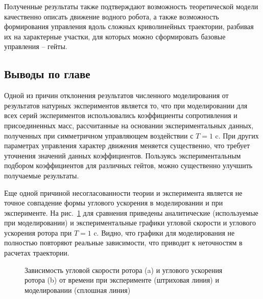 
Полученные результаты также подтверждают возможность теоретической модели качественно описать движение водного робота, а также возможность формирования управления вдоль сложных криволинейных траектории, разбивая их на характерные участки, для которых можно сформировать базовые управления -- гейты. 

\subsection{Выводы по главе}

Одной из причин отклонения результатов численного моделирования от результатов натурных экспериментов является то, что при моделировании для всех серий экспериментов использовались коэффициенты сопротивления и присоединенных масс, рассчитанные на основании экспериментальных  данных, полученных при симметричном управляющем воздействии с $T = 1$ c. При других параметрах управления характер движения меняется существенно, что требует уточнения значений данных коэффициентов. Пользуясь экспериментальным подбором коэффициентов для различных гейтов, можно существенно улучшить получаемые результаты.

Еще одной причиной несогласованности теории и эксперимента является не точное совпадение формы углового ускорения в моделировании и при эксперименте. На рис.~\ref{OmegaT1EpsilonT1} для сравнения приведены аналитические (используемые при моделировании) и экспериментальные графики угловой скорости и углового ускорения ротора при $ T = 1 $ c. Видно, что графики для моделирования не полностью повторяют реальные зависимости, что приводит к неточностям в расчетах траектории.

\begin{figure}[!ht]
	\begin{minipage}[h]{0.5\linewidth}
	\end{minipage}
	\hfill
	\begin{minipage}[h]{0.5\linewidth}
	\end{minipage}
	\caption{Зависимость угловой скорости ротора (a) и углового ускорения ротора (b) от времени при эксперименте (штриховая линия) и моделировании (сплошная линия)}
	\label{OmegaT1EpsilonT1}
\end{figure}

